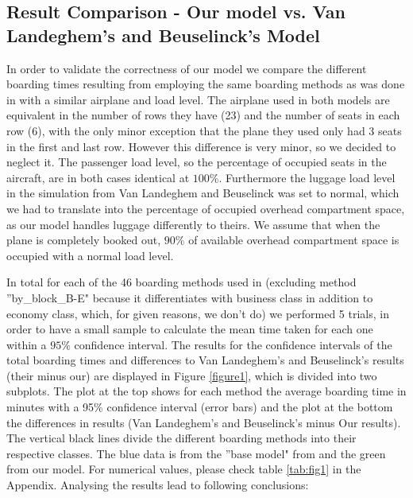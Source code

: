 \documentclass[11pt]{article}
\begin{document}
\subsection{Result Comparison - Our model vs. Van Landeghem's and Beuselinck's Model} \label{model_comp}
In order to validate the correctness of our model we compare the different boarding times resulting from employing the same boarding methods as was done in \cite{beus} with a similar airplane and load level. The airplane used in both models are equivalent in the number of rows they have (23) and the number of seats in each row (6), with the only minor exception that the plane they used only had 3 seats in the first and last row. However this difference is very minor, so we decided to neglect it. The passenger load level, so the percentage of occupied seats in the aircraft, are in both cases identical at $100\%$. Furthermore the luggage load level in the simulation from Van Landeghem and Beuselinck was set to normal, which we had to translate into the percentage of occupied overhead compartment space, as our model handles luggage differently to theirs. We assume that when the plane is completely booked out, $90\%$ of available overhead compartment space is occupied with a normal load level.

In total for each of the 46 boarding methods used in \cite{beus}(excluding method ''by\_block\_B-E" because it differentiates with business class in addition to economy class, which, for given reasons, we don't do) we performed 5 trials, in order to have a small sample to calculate the mean time taken for each one within a $95\%$ confidence interval.
The results for the confidence intervals of the total boarding times and differences to Van Landeghem's and Beuselinck's results (their minus our) are displayed in Figure \ref{figure1}, which is divided into two subplots. The plot at the top shows for each method the average boarding time in minutes with a 95\% confidence interval (error bars) and the plot at the bottom the differences in results (Van Landeghem's and Beuselinck's minus Our results). The vertical black lines divide the different boarding methods into their respective classes. The blue data is from the ''base model" from \cite{beus} and the green from our model. For numerical values, please check table \ref*{tab:fig1} in the Appendix. 
Analysing the results lead to following conclusions:
\end{document}
